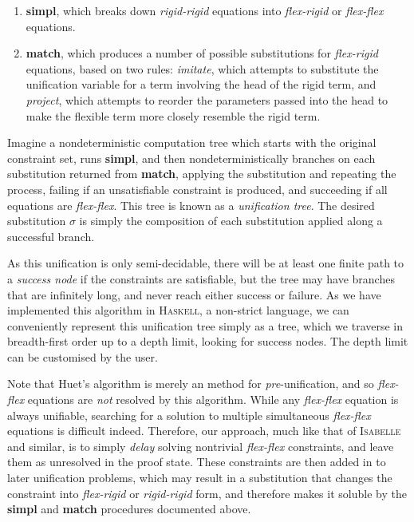 \documentclass[a4paper]{jfp}
\begin{document}
\begin{enumerate}
   \item \textbf{simpl}, which breaks down \emph{rigid-rigid} equations into \emph{flex-rigid} or
                         \emph{flex-flex} equations.
   \item \textbf{match}, which produces a number of possible substitutions for \emph{flex-rigid}
           equations, based on two rules: \emph{imitate}, which attempts to substitute the unification
           variable for a term involving the head of the rigid term, and \emph{project}, which
           attempts to reorder the parameters passed into the head to make the flexible term more
           closely resemble the rigid term.
\end{enumerate}

Imagine a nondeterministic computation tree which starts with the original constraint set,
runs \textbf{simpl}, and then nondeterministically branches on each substitution returned from 
\textbf{match}, applying the substitution and repeating the process, failing if an unsatisfiable
constraint is produced, and succeeding if all equations are \emph{flex-flex}. This tree is known
as a \emph{unification tree}. The desired substitution $\sigma$ is simply the composition of each
substitution applied along a successful branch.

As this unification is only semi-decidable, there will be at least one finite path to a
\emph{success node} if the constraints are satisfiable, but the tree may have branches that are
infinitely long, and never reach either success or failure. As we have implemented this algorithm in \textsc{Haskell}, a non-strict language, we can conveniently represent this unification tree simply as a tree, which we traverse in breadth-first order up to a depth limit, looking for success nodes. The depth limit can be customised by the user.

Note that Huet's algorithm is merely an method for \emph{pre}-unification, and so \emph{flex-flex}
equations are \emph{not} resolved by this algorithm. While any \emph{flex-flex} equation
is always unifiable, searching for a
solution to multiple simultaneous \emph{flex-flex} equations is difficult indeed. Therefore, 
our approach, much like that of \textsc{Isabelle} and similar,
is to simply \emph{delay} solving nontrivial \emph{flex-flex} constraints, and 
leave them as unresolved in  the proof state. These constraints are then added in to later 
unification problems, which may result in a substitution that changes the constraint into 
\emph{flex-rigid} or \emph{rigid-rigid} form, and therefore makes it soluble by the \textbf{simpl} 
and \textbf{match} procedures documented above.
\end{document}
